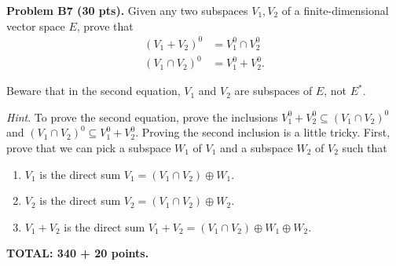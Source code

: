 \documentclass[12pt]{article}
\begin{document}
\vspace {0.25cm}\noindent
{\bf Problem B7 (30 pts).}
Given any two subspaces $V_1, V_2$ of a finite-dimensional
vector space $E$,
prove that
\begin{align*}
(V_1 + V_2)^{0} & = V_1^0\cap V_2^0 \\
(V_1 \cap V_2)^{0}& = V_1^0 +  V_2^0.
\end{align*}

Beware that in the second equation, $V_1$ and $V_2$ are subspaces of
$E$, not $E^*$.

\medskip\noindent
{\it Hint\/}. To prove the second equation, prove the inclusions
$V_1^0 +  V_2^0 \subseteq (V_1 \cap V_2)^{0}$ and
$(V_1 \cap V_2)^{0} \subseteq  V_1^0 +  V_2^0$.
Proving the second inclusion is a little tricky. First, prove that
we can pick a subspace $W_1$ of $V_1$ and a
subspace $W_2$ of $V_2$ such that 
\begin{enumerate}
\item
$V_1$ is the direct sum
$V_1 = (V_1\cap V_2) \oplus W_1$.
\item 
$V_2$ is the direct sum
$V_2 = (V_1\cap V_2) \oplus W_2$.
\item
$V_1 + V_2$ is the direct sum
$V_1 + V_2 = (V_1 \cap V_2) \oplus W_1\oplus W_2$.
\end{enumerate}



\vspace{0.5cm}\noindent
{\bf TOTAL: 340 + 20  points.}
\end{document}
